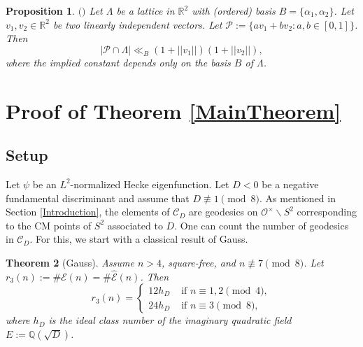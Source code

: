 \documentclass[11pt]{amsart}
\newcommand{\bigo}{\mathcal{O}}
\newcommand{\R}{\mathbb{R}}
\newcommand{\Q}{\mathbb{Q}}
\newtheorem{theorem}{Theorem}[section]
\newtheorem{proposition}[theorem]{Proposition}
\theoremstyle{definition}
\theoremstyle{remark}
\begin{document}
\begin{proposition}\label{Lipschitz-Dana}
$\mathrm{(}$\cite[Cor. 3.5]{DanaMScThesis}$\mathrm{)}$ Let $\Lambda$ be a lattice in $\R^2$ with (ordered) basis $B = \{\alpha_1, \alpha_2\}$. Let $v_1, v_2\in \R^2$ be two linearly independent vectors. Let $\mathcal{P}:= \{av_1 + bv_2 : a,b\in [0,1]\}$. Then $$ |\mathcal{P}\cap \Lambda| \ll_{B} (1+||v_1||)(1+||v_2||),$$ where the implied constant depends only on the basis $B$ of $\Lambda$.
\end{proposition}









\section{Proof of Theorem \ref{MainTheorem}}\label{Proof}




\subsection{Setup}

Let $\psi$ be an $L^2$-normalized Hecke eigenfunction. Let $D<0$ be a negative fundamental discriminant and assume that $D\not\equiv 1 \pmod{8}$. As mentioned in Section \ref{Introduction}, the elements of $\mathcal{C}_D$ are geodesics on $\bigo^{\times} \backslash S^2$ corresponding to the CM points of $S^2$ associated to $D$. One can count the number of geodesics in $\mathcal{C}_D$. For this, we start with a classical result of Gauss.

\begin{theorem}[Gauss]\label{GaussThm}
Assume $n>4$, square-free, and $n\not\equiv 7\pmod{8}$. Let $r_3(n) := \# \mathcal{E}(n) = \# \widehat{\mathcal{E}}(n)$. Then
\begin{equation*}
    r_3(n) = \begin{cases}
        12h_D & \text{ if } n \equiv 1,2 \pmod{4}, \\
        24h_D & \text{ if } n \equiv 3 \pmod{8},
    \end{cases}
\end{equation*}
where $h_D$ is the ideal class number of the imaginary quadratic field $E:=\Q(\sqrt{D})$.
\end{theorem}
\end{document}
